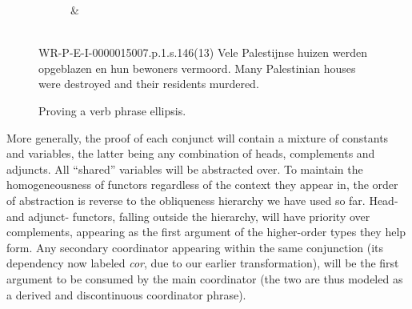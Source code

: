 \begin{figure}
\begin{subfigure}{1\textwidth}
{{{{{%
						}
					}
				}
				&
			}
		}
	\end{subfigure}\\[\smallsep]
	\aethelcap
		{WR-P-E-I-0000015007.p.1.s.146(13)}
		{Vele Palestijnse huizen werden opgeblazen en hun bewoners vermoord.}
		{Many Palestinian houses were destroyed and their residents murdered.}
		{}
	\caption{Proving a verb phrase ellipsis.}
	\label{figure:vp_ellipsis}
\end{figure}

More generally, the proof of each conjunct will contain a mixture of constants and variables, the latter being any combination of heads, complements and adjuncts.
All ``shared'' variables will be abstracted over.
To maintain the homogeneousness of functors regardless of the context they appear in, the order of abstraction is reverse to the obliqueness hierarchy we have used so far.
Head- and adjunct- functors, falling outside the hierarchy, will have priority over complements, appearing as the first argument of the higher-order types they help form.
Any secondary coordinator appearing within the same conjunction (its dependency now labeled \textit{cor}, due to our earlier transformation), will be the first argument to be consumed by the main coordinator (the two are thus modeled as a derived and discontinuous coordinator phrase).

